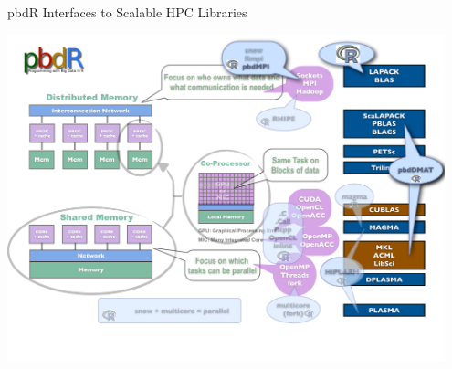 \begin{frame}
\begin{block}{pbdR Interfaces to Scalable HPC Libraries}
    
\includegraphics[width=0.95\textwidth]
{../common/pics/hardware/ParallelHardware13.pdf}
\end{block}
\end{frame}